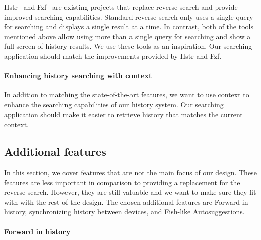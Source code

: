 \documentclass[thesis=M,english]{FITthesis}[2012/10/20]
\let\myCite\cite
\renewcommand\cite{\unskip~\myCite}
\begin{document}
Hstr\cite{toolshstr} and Fzf\cite{tools-fzf} are existing projects that replace reverse search and provide improved searching capabilities. 
Standard reverse search only uses a single query for searching and displays a single result at a time. In contrast, both of the tools mentioned above allow using more than a single query for searching and show a full screen of history results. We use these tools as an inspiration. Our searching application should match the improvements provided by Hstr and Fzf. 

\paragraph{Enhancing history searching with context}


In addition to matching the state-of-the-art features, we want to use context to enhance the searching capabilities of our history system. Our searching application should make it easier to retrieve history that matches the current context. 





\subsection{Additional features}

In this section, we cover features that are not the main focus of our design. These features are less important in comparison to providing a replacement for the reverse search. However, they are still valuable and we want to make sure they fit with with the rest of the design. 
The chosen additional features are Forward in history, synchronizing history between devices, and Fish-like Autosuggestions.



\paragraph{Forward in history}
\end{document}
